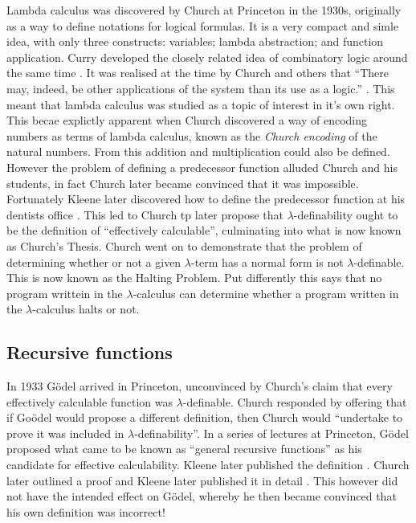Lambda calculus was discovered by Church at Princeton in the 1930s, originally as a way to define notations for logical formulas.
It is a very compact and simle idea, with only three constructs: variables; lambda abstraction; and function application.
Curry developed the closely related idea of combinatory logic around the same time \cite{curry1930a, curry1930b}.
It was realised at the time by Church and others that ``There may, indeed, be other applications of the system than its use as a logic.'' \cite{church1932, church1933}.
This meant that lambda calculus was studied as a topic of interest in it's own right.
This becae explictly apparent when Church discovered a way of encoding numbers as terms of lambda calculus, known as the \emph{Church encoding} of the natural numbers.
From this addition and multiplication could also be defined.
However the problem of defining a predecessor function alluded Church and his students, in fact Church later became convinced that it was impossible.
Fortunately Kleene later discovered how to define the predecessor function at his dentists office \cite{kleene1935a, kleene1935b}.
This led to Church tp later propose that $\lambda$-definability ought to be the definition of ``effectively calculable'', culminating into what is now known as Church's Thesis. Church went on to demonstrate that the problem of determining whether or not a given $\lambda$-term  has a normal form is not $\lambda$-definable.
This is now known as the Halting Problem.
Put differently this says that no program writtein in the $\lambda$-calculus can determine whether a program written in the $\lambda$-calculus halts or not.

\subsection{Recursive functions}

In 1933 G\"odel arrived in Princeton, unconvinced by Church's claim that every effectively calculable function was $\lambda$-definable. Church responded by offering that if Go\"odel would propose a different definition, then Church would ``undertake to prove it was included in $\lambda$-definability''. In a series of lectures at Princeton, G\"odel proposed what came to be known as ``general recursive functions'' as his candidate for effective calculability. Kleene later published the definition \cite{kleene1936}. Church later outlined a proof \cite{church1936} and Kleene later published it in detail \cite{kleene1936b}. This however did not have the intended effect on G\"odel, whereby he then became convinced that his own definition was incorrect!

